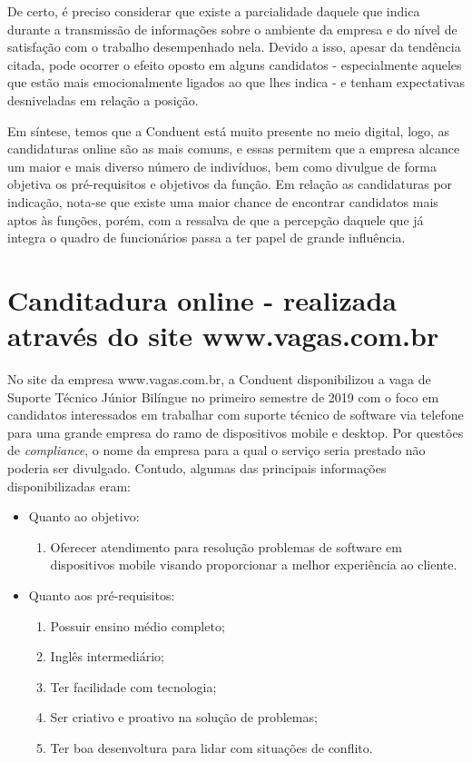 \documentclass[12pt]{article}
\begin{document}
De certo, é preciso considerar que existe a parcialidade daquele que indica durante a transmissão de informações sobre o ambiente da empresa e do nível de satisfação com o trabalho desempenhado nela. Devido a isso, apesar da tendência citada, pode ocorrer o efeito oposto em alguns candidatos - especialmente aqueles que estão mais emocionalmente ligados ao que lhes indica - e tenham expectativas desniveladas em relação a posição.

Em síntese, temos que a Conduent está muito presente no meio digital, logo, as candidaturas online são as mais comuns, e essas permitem que a empresa alcance um maior e mais diverso número de indivíduos, bem como divulgue de forma objetiva os pré-requisitos e objetivos da função. Em relação as candidaturas por indicação, nota-se que existe uma maior chance de encontrar candidatos mais aptos às funções, porém, com a ressalva de que a percepção daquele que já integra o quadro de funcionários passa a ter papel de grande influência.  
 
\section*{Canditadura online - realizada através do site www.vagas.com.br}
 
No site da empresa www.vagas.com.br, a Conduent disponibilizou a vaga de Suporte Técnico Júnior Bilíngue no primeiro semestre de 2019 com o foco em candidatos interessados em trabalhar com suporte técnico de software via telefone para uma grande empresa do ramo de dispositivos mobile e desktop. Por questões de  \emph {compliance}, o nome da empresa para a qual o serviço seria prestado não poderia ser divulgado. Contudo, algumas das principais informações disponibilizadas eram: 
 
  \begin{itemize}
\item Quanto ao objetivo:
	\begin{enumerate}
	\item Oferecer atendimento para resolução problemas de software em dispositivos mobile 	visando proporcionar a melhor experiência ao cliente.
	\end{enumerate}
\end{itemize}


 \begin{itemize}
\item Quanto aos pré-requisitos:
	\begin{enumerate}
   	\item Possuir ensino médio completo;
	\item Inglês intermediário;
   	\item Ter facilidade com tecnologia; 
   	\item Ser criativo e proativo na solução de problemas; 
   	\item Ter boa desenvoltura para lidar com situações de conflito. 
	\end{enumerate}
\end{itemize}
\end{document}
